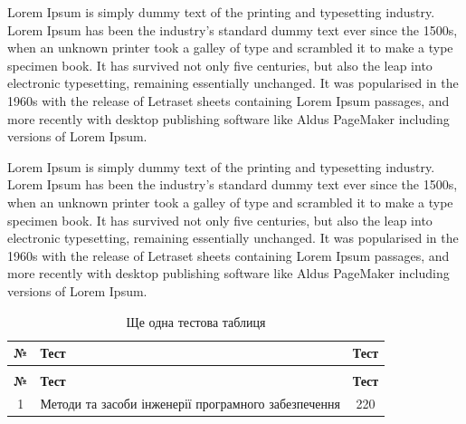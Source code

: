 
Lorem Ipsum is simply dummy text of the printing and typesetting industry.
Lorem Ipsum has been the industry’s standard dummy text ever since the 1500s, when
an unknown printer took a galley of type and scrambled it to make a type specimen
book. It has survived not only five centuries, but also the leap into electronic typesetting,
remaining essentially unchanged. It was popularised in the 1960s with the release of
Letraset sheets containing Lorem Ipsum passages, and more recently with desktop
publishing software like Aldus PageMaker including versions of Lorem Ipsum.


Lorem Ipsum is simply dummy text of the printing and typesetting industry.
Lorem Ipsum has been the industry’s standard dummy text ever since the 1500s, when
an unknown printer took a galley of type and scrambled it to make a type specimen
book. It has survived not only five centuries, but also the leap into electronic typesetting,
remaining essentially unchanged. It was popularised in the 1960s with the release of
Letraset sheets containing Lorem Ipsum passages, and more recently with desktop
publishing software like Aldus PageMaker including versions of Lorem Ipsum.

\begin{spacing}{1.3}
\noindent
\begin{xltabular}{\textwidth}{| c | >{\raggedright\arraybackslash}X | c |}
    \caption{Ще одна тестова таблиця} \label{tab:test_table2} \\
    \hline
    \textbf{№} & \textbf{Тест} & \textbf{Тест} \\ \hline
    \endfirsthead

     \\ \hline
    \textbf{№} & \textbf{Тест} & \textbf{Тест} \\ \hline
    \endhead

    1 & Методи та засоби інженерії програмного забезпечення & 220 \\ \hline
\end{xltabular}
\end{spacing}